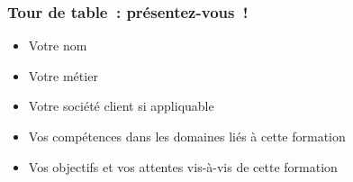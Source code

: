 \begin{frame}
  \frametitle{Tour de table~: présentez-vous~!}
  \begin{itemize}
    \item Votre nom
    \item Votre métier
    \item Votre société client si appliquable
    \item Vos compétences dans les domaines liés à cette formation
    \item Vos objectifs et vos attentes vis-à-vis de cette formation
  \end{itemize}
\end{frame}
